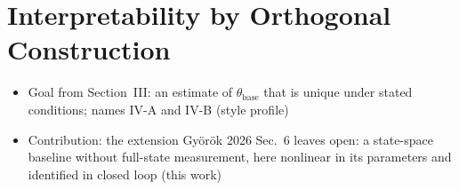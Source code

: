 %
\section{Interpretability by Orthogonal Construction}\label{sec:obc}
\ifdraft
\begin{itemize}
\item Goal from Section~III: an estimate of $\theta_{\mathrm{base}}$ that is unique under stated conditions; names IV-A and IV-B (style profile)
\item Contribution: the extension Gy\"or\"ok 2026 Sec.~6 leaves open: a state-space baseline without full-state measurement, here nonlinear in its parameters and identified in closed loop (this work)
\end{itemize}
\fi
\changelegend


